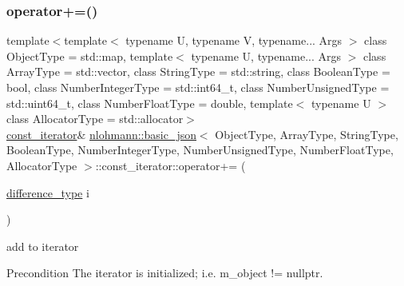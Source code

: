 \subsubsection{\texorpdfstring{operator+=()}{operator+=()}}
{\footnotesize\ttfamily template$<$template$<$ typename U, typename V, typename... Args $>$ class Object\+Type = std\+::map, template$<$ typename U, typename... Args $>$ class Array\+Type = std\+::vector, class String\+Type  = std\+::string, class Boolean\+Type  = bool, class Number\+Integer\+Type  = std\+::int64\+\_\+t, class Number\+Unsigned\+Type  = std\+::uint64\+\_\+t, class Number\+Float\+Type  = double, template$<$ typename U $>$ class Allocator\+Type = std\+::allocator$>$ \\
\hyperlink{classnlohmann_1_1basic__json_1_1const__iterator}{const\+\_\+iterator}\& \hyperlink{classnlohmann_1_1basic__json}{nlohmann\+::basic\+\_\+json}$<$ Object\+Type, Array\+Type, String\+Type, Boolean\+Type, Number\+Integer\+Type, Number\+Unsigned\+Type, Number\+Float\+Type, Allocator\+Type $>$\+::const\+\_\+iterator\+::operator+= (\begin{DoxyParamCaption}\item[{\hyperlink{classnlohmann_1_1basic__json_1_1const__iterator_a49d7c3e9ef3280df03052cce988b792f}{difference\+\_\+type}}]{i }\end{DoxyParamCaption})\hspace{0.3cm}{\ttfamily [inline]}}



add to iterator 

\begin{DoxyPrecond}{Precondition}
The iterator is initialized; i.\+e. {\ttfamily m\+\_\+object != nullptr}. 
\end{DoxyPrecond}
\mbox{\label{classnlohmann_1_1basic__json_1_1const__iterator_abc4552ba2fe39e7901a83dd6d4dec151}} 
